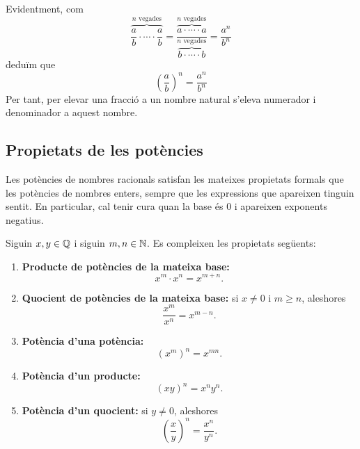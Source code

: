Evidentment, com%
\[
\overset{n\text{ vegades}}{\overbrace{\frac{a}{b}\cdot\cdots\cdot\frac{a}{b}}%
}=\frac{\overset{n\text{ vegades}}{\overbrace{a\cdot\cdots\cdot a}}%
}{\overset{n\text{ vegades}}{\overbrace{b\cdot\cdots\cdot b}}}=\frac{a^{n}%
}{b^{n}}%
\]
deduïm que%
\[
\left(  \frac{a}{b}\right)  ^{n}=\frac{a^{n}}{b^{n}}%
\]
Per tant, per elevar una fracció a un nombre natural s’eleva
numerador i denominador a aquest nombre.

\subsection{Propietats de les potències}

Les potències de nombres racionals satisfan les mateixes propietats formals que les potències de nombres enters, sempre que les expressions que apareixen tinguin sentit. En particular, cal tenir cura quan la base és \(0\) i apareixen exponents negatius.

\begin{proposicio}
Siguin \(x,y\in\mathbb{Q}\) i siguin \(m,n\in\mathbb{N}\). Es compleixen les propietats següents:
\begin{enumerate}
	\item \textbf{Producte de potències de la mateixa base:}
	\[
		x^m\cdot x^n=x^{m+n}.
	\]

	\item \textbf{Quocient de potències de la mateixa base:}
	si \(x\neq0\) i \(m\geq n\), aleshores
	\[
		\frac{x^m}{x^n}=x^{m-n}.
	\]

	\item \textbf{Potència d'una potència:}
	\[
		\left(x^m\right)^n=x^{mn}.
	\]

	\item \textbf{Potència d'un producte:}
	\[
		(xy)^n=x^n y^n.
	\]

	\item \textbf{Potència d'un quocient:}
	si \(y\neq0\), aleshores
	\[
		\left(\frac{x}{y}\right)^n=\frac{x^n}{y^n}.
	\]
\end{enumerate}
\end{proposicio}

